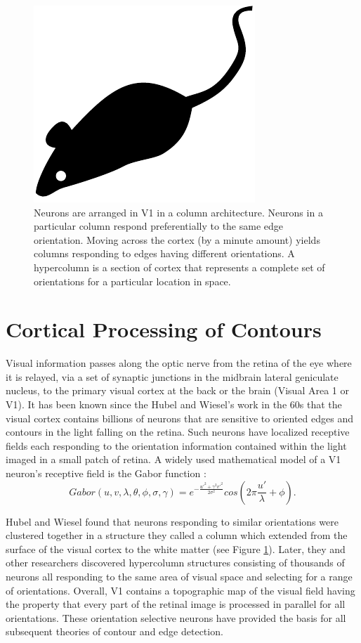 \documentclass[prodmode,acmtap]{acmlarge}
\begin{document}
\begin{figure}[tp]
\centering
\includegraphics{acmlarge-mouse}
\caption{Neurons are arranged in V1 in a column architecture. Neurons
in a particular column respond preferentially to the same edge
orientation. Moving across the cortex (by a minute amount) yields
columns responding to edges having different orientations. A
hypercolumn is a section of cortex that represents a complete set of
orientations for a particular location in space.}
\label{corticalarchitecturefig}
\end{figure}

\section{Cortical Processing of Contours}
Visual information passes along the optic nerve from the retina of
the eye where it is relayed, via a set of synaptic junctions in the
midbrain lateral geniculate nucleus, to the primary visual cortex at
the back or the brain (Visual Area 1 or V1). It has been known since
the Hubel and Wiesel's work in the 60s that the visual cortex
contains billions of neurons that are sensitive to oriented edges and
contours in the light falling on the retina. Such neurons have
localized receptive fields each responding to the orientation
information contained within the light imaged in a small patch of
retina. A widely used mathematical model of a V1 neuron's receptive
field is the Gabor function \cite{Daugman1985}:
\begin{equation}
\label{gaboreqn}
Gabor(u,v,\lambda,\theta,\phi,\sigma,\gamma)=e^{-\frac{u'^{2}+
\gamma^{2}v'^{2}}{2\sigma^{2}}}cos(2\pi\frac{u'}{\lambda}+\phi).
\end{equation}

Hubel and Wiesel \citeyear{Hubel1962,Hubel1968} found that neurons
responding to similar orientations were clustered together in a
structure they called a column which extended from the surface of the
visual cortex to the white matter (see Figure
\ref{corticalarchitecturefig}). Later, they and other researchers
discovered hypercolumn structures consisting of thousands of neurons
all responding to the same area of visual space and selecting for a
range of orientations. Overall, V1 contains a topographic map of the
visual field having the property that every part of the retinal image
is processed in parallel for all orientations. These orientation
selective neurons have provided the basis for all subsequent theories
of contour and edge detection.
\end{document}
